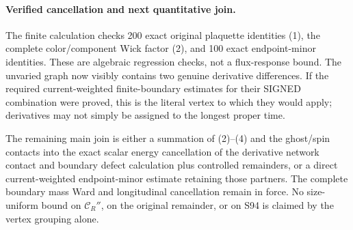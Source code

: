\documentclass[11pt]{article}
\begin{document}
\paragraph{Verified cancellation and next quantitative join.}
The finite calculation
checks 200 exact original plaquette identities (1), the complete
color/component Wick factor (2), and 100 exact endpoint-minor identities.
These are algebraic regression checks, not a flux-response bound.
The unvaried graph now visibly contains two genuine derivative
differences. If the required current-weighted finite-boundary estimates
for their SIGNED combination were proved, this is the literal vertex
to which they would apply; derivatives may not simply be assigned to
the longest proper time.

The remaining main join is either a summation of (2)--(4) and the
ghost/spin contacts into the exact scalar energy cancellation of
the derivative network contact and boundary defect calculation plus controlled remainders, or a direct current-weighted
endpoint-minor estimate retaining those partners. The complete
boundary mass Ward and longitudinal cancellation remain in force.
No size-uniform bound on $\mathcal C_R''$, on the original remainder,
or on S94 is claimed by the vertex grouping alone.
\end{document}
